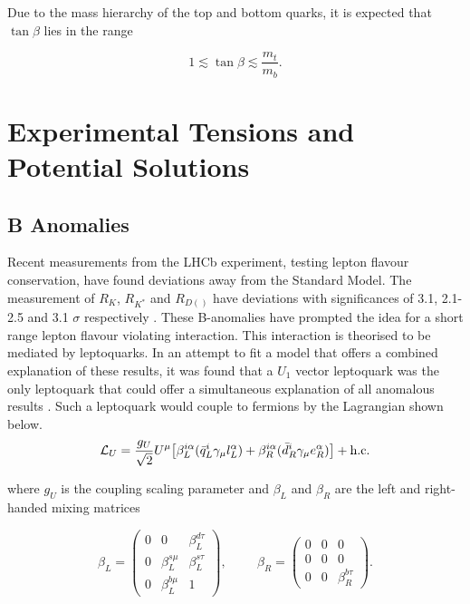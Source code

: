 Due to the mass hierarchy of the top and bottom quarks, it is expected that \(\tan\beta\) lies in the range

\begin{equation}
    1 \lesssim \tan\beta \lesssim \frac{m_t}{m_b}.
\end{equation}


\section{Experimental Tensions and Potential Solutions}

\subsection{B Anomalies}

Recent measurements from the LHCb experiment, testing lepton flavour conservation, have found deviations away from the Standard Model. The measurement of $R_{K}$, $R_{K^{*}}$ and $R_{D(^{})}$ have deviations with significances of 3.1, 2.1-2.5 and 3.1 $\sigma$ respectively \cite{Rk,Rkstar,Rd}. These B-anomalies have prompted the idea for a short range lepton flavour violating interaction. This interaction is theorised to be mediated by leptoquarks. In an attempt to fit a model that offers a combined explanation of these results, it was found that a $U_{1}$ vector leptoquark was the only leptoquark that could offer a simultaneous explanation of all anomalous results \cite{leptoquark}. Such a leptoquark would couple to fermions by the Lagrangian shown below. \\

\begin{equation}
\mathcal{L}_{U} = \frac{g_{U}}{\sqrt{2}} U^{\mu} \big[ \beta_{L}^{i\alpha}( \bar{q}_{L}^{i} \gamma_{\mu} l_{L}^{\alpha}) + \beta_{R}^{i\alpha}( \bar{d}_{R}^{i} \gamma_{\mu} e_{R}^{\alpha}) \big] + \text{h.c.}
\end{equation}

where $g_{U}$ is the coupling scaling parameter and $\beta_{L}$ and $\beta_{R}$ are the left and right-handed mixing matrices

\begin{equation}
\beta_{L} = 
\begin{pmatrix}
0 & 0 & \beta_{L}^{d\tau} \\
0 & \beta_{L}^{s\mu} & \beta_{L}^{s\tau} \\
0 & \beta_{L}^{b\mu} & 1
\end{pmatrix},
\hspace{1cm}
\beta_{R} = 
\begin{pmatrix}
0 & 0 & 0 \\
0 & 0 & 0 \\
0 & 0 & \beta_{R}^{b\tau}
\end{pmatrix}.
\end{equation}

